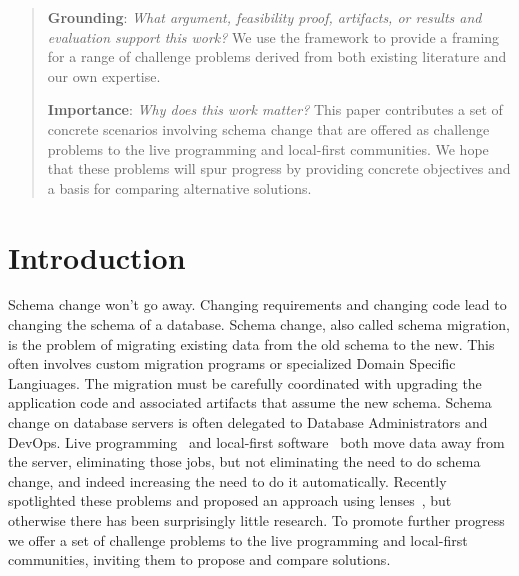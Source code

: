 \documentclass[english,submission]{programming}
\begin{document}
\begin{abstract}
\noindent\textbf{Grounding}: \emph{What argument, feasibility proof, artifacts, or results and evaluation support this work?}
We use the framework to provide a framing for a range of challenge problems derived from both
existing literature and our own expertise.

\noindent\textbf{Importance}: \emph{Why does this work matter?}
This paper contributes a set of concrete scenarios involving schema change that are offered as
challenge problems to the live programming and local-first communities. We hope that these
problems will spur progress by providing concrete objectives and a basis for comparing alternative
solutions.

\end{abstract}

\section{Introduction}

Schema change won't go away. Changing requirements and changing code lead to changing the schema of a database. Schema change, also called schema migration, is the problem of migrating existing data from the old schema to the new. This often involves custom migration programs or specialized Domain Specific Langiuages. The migration must be carefully coordinated with upgrading the application code and associated artifacts that assume the new schema. Schema change on database servers is often delegated to Database Administrators and DevOps. Live programming~\cite{tanimoto90,hancock03} and local-first software~\cite{localfirst} both move data away from the server, eliminating those jobs, but not eliminating the need to do schema change, and indeed increasing the need to do it automatically. Recently \citet{Cambria} spotlighted these problems and proposed an approach using lenses~\cite{Foster2007}, but otherwise there has been surprisingly little research. To promote further progress we offer a set of challenge problems to the live programming and local-first communities, inviting them to propose and compare solutions.
\end{document}
